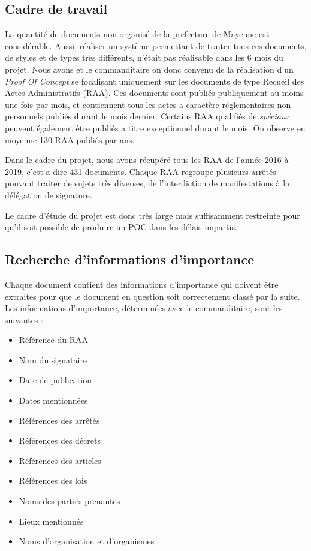 
\subsection {Cadre de travail}
La quantité de documents non organisé de la prefecture de Mayenne est considérable.
Aussi, réaliser un système permettant de traiter tous ces documents, de styles et de types très différents, n'était pas réalisable dans les 6 mois du projet.
Nous avons et le commanditaire on donc convenu de la réalisation d'un \textit{Proof Of Concept} se focalisant uniquement sur les documents de type Recueil des Actes Administratifs (RAA).
Ces documents sont publiés publiquement au moins une fois par mois, et contiennent tous les actes a caractère réglementaires non personnels publiés durant le mois dernier.
Certains RAA qualifiés de \textit{spéciaux} peuvent également être publiés a titre exceptionnel durant le mois.
On observe en moyenne 130 RAA publiés par ans.

Dans le cadre du projet, nous avons récupéré tous les RAA de l'année 2016 à 2019, c'est a dire 431 documents.
Chaque RAA regroupe plusieurs arrêtés pouvant traiter de sujets très diverses, de l'interdiction de manifestations à la délégation de signature.

Le cadre d'étude du projet est donc très large mais suffisamment restreinte pour qu'il soit possible de produire un POC dans les délais impartis. 

\subsection{Recherche d'informations d'importance} %
Chaque document contient des informations d'importance qui doivent être extraites pour que le document en question soit correctement classé par la suite.
Les informations d'importance, déterminées avec le commanditaire, sont les suivantes :
\begin {itemize}
\item Référence du RAA
\item Nom du signataire
\item Date de publication
\item Dates mentionnées
\item Références des arrêtés
\item Références des décrets
\item Références des articles
\item Références des lois
\item Noms des parties prenantes
\item Lieux mentionnés
\item Noms d'organisation et d'organismes
\end {itemize}



